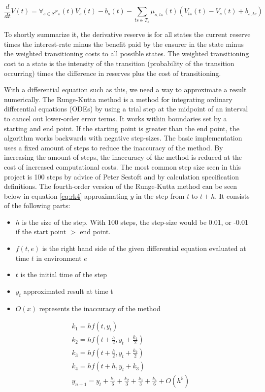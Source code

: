 \begin{equation}\label{eq:thiele}
\frac{d}{dt}V(t) = \forall_{s\in S} r_s(t) V_s(t) - b_s(t) - \sum_{ts \in T_{s}} \mu_{s,ts}(t) (V_{ts}(t) - V_s(t) + b_{s,ts})
\end{equation}

To shortly summarize it, the derivative reserve is for all states the current reserve times the interest-rate minus the benefit paid by the ensurer in the state minus the weighted transitioning costs to all possible states. 
The weighted transitioning cost to a state is the intensity of the transition (probability of the transition occurring) times the difference in reserves plus the cost of transitioning.

With a differential equation such as this, we need a way to approximate a result numerically. 
The Runge-Kutta method\cite{press2007numerical} is a method for integrating ordinary differential equations (ODEs) by using a trial step at the midpoint of an interval to cancel out lower-order error terms.
It works within boundaries set by a starting and end point. If the starting point is greater than the end point, the algorithm works backwards with negative step-sizes.
The basic implementation uses a fixed amount of steps to reduce the inaccuracy of the method. 
By increasing the amount of steps, the inaccuracy of the method is reduced at the cost of increased computational costs.
The most common step size seen in this project is 100 steps by advice of Peter Sestoft and by calculation specification definitions.
The fourth-order version of the Runge-Kutta method can be seen below in equation \ref{eq:rk4} approximating $y$ in the step from $t$ to $t+h$. It consists of the following parts:

\begin{itemize}
\item $h$ is the size of the step. With 100 steps, the step-size would be 0.01, or -0.01 if the start point $>$ end point.
\item $f(t, e)$  is the right hand side of the given differential equation evaluated at time $t$ in environment $e$
\item $t$ is the initial time of the step
\item $y_t$ approximated result at time t
\item $O(x)$ represents the inaccuracy of the method
\end{itemize}

\begin{equation}\begin{aligned}\label{eq:rk4}
&k_1 = h f(t, y_t)\\
&k_2 = h f(t + \frac{h}{2}, y_t + \frac{k_1}{2})\\
&k_3 = h f(t + \frac{h}{2}, y_t + \frac{k_2}{2})\\
&k_4 = h f(t + h, y_t + k_3)\\
&y_{n+1} = y_t + \frac{k_1}{6} + \frac{k_2}{3} + \frac{k_3}{3} + \frac{k_4}{6} + O(h^5)
\end{aligned}\end{equation}

